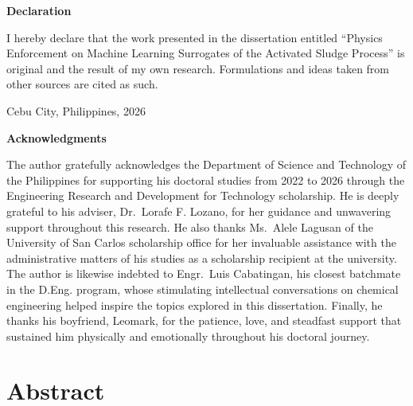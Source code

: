 \documentclass[12pt,twoside]{book}
\makeatletter
\newcommand{\@singlepar@cr}[1][]{\unskip\space\ignorespaces}
\newenvironment{singlepar}{%
  \def\par{\unskip\space\ignorespaces}%
  \def\newline{\unskip\space\ignorespaces}%
  \renewcommand{\\}{\@ifstar{\@singlepar@cr}{\@singlepar@cr}}%
  \ignorespaces
}{\endgraf}
\newcommand{\thesisYear}{2026}
\newcommand{\thesisTitle}{Physics Enforcement on Machine Learning Surrogates of the Activated Sludge Process}
\newcommand{\thesisAuthor}{Egberto F. Selerio Jr.}
\newcommand{\thesisPlace}{Cebu City, Philippines}
\makeatother
\begin{document}

\newpage
\pagestyle{plain}

\null
\vfill
{\noindent\bf Declaration}

\begin{singlepar}
    I hereby declare that the work presented in the dissertation entitled \enquote{\thesisTitle} is original
    and the result of my own research. Formulations and ideas taken from other sources are cited as such.
\end{singlepar}

\vspace{3em}

\noindent\thesisPlace, \thesisYear \hfill \makebox[15em]{\hrulefill}
\par\noindent\hfill\makebox[15em][c]{\thesisAuthor}



\newpage
\pagestyle{plain}

\null
\vfill
{\noindent\bf Acknowledgments}

The author gratefully acknowledges the Department of Science and Technology of the Philippines for
supporting his doctoral studies from 2022 to 2026 through the Engineering Research and Development for
Technology scholarship. He is deeply grateful to his adviser, Dr.~Lorafe F. Lozano, for her guidance and
unwavering support throughout this research. He also thanks Ms.~Alele Lagusan of the University of San Carlos scholarship office for her
invaluable assistance with the administrative matters of his studies as a scholarship recipient at the university. The author is
likewise indebted to Engr.~Luis Cabatingan, his closest batchmate in the D.Eng. program, whose stimulating
intellectual conversations on chemical engineering helped inspire the topics explored in this dissertation.
Finally, he thanks his boyfriend, Leomark, for the patience, love, and steadfast support that sustained him
physically and emotionally throughout his doctoral journey.



\cleardoublepage
\chapter*{Abstract}
\end{document}
